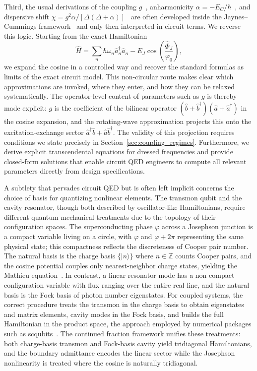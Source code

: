 \documentclass[reprint, floatfix, superscriptaddress, amsmath, amssymb, longbibliography]{revtex4-2}
\begin{document}
Third, the usual derivations of the coupling $g$~\cite{Blais2004}, anharmonicity $\alpha=-E_C/\hbar$~\cite{Koch2007}, and dispersive shift $\chi=g^2\alpha/[\Delta(\Delta+\alpha)]$~\cite{Koch2007, Boissonneault2009} are often developed inside the Jaynes--Cummings framework~\cite{JaynesCummings1963} and only then interpreted in circuit terms. We reverse this logic. Starting from the exact Hamiltonian
\begin{equation}
\hat{H}=\sum_n \hbar\omega_n \hat{a}_n^\dagger \hat{a}_n - E_J\cos\left(\frac{\hat{\Phi}_J}{\varphi_0}\right),
\end{equation}
we expand the cosine in a controlled way and recover the standard formulas as limits of the exact circuit model. This non-circular route makes clear which approximations are invoked, where they enter, and how they can be relaxed systematically. The operator-level content of parameters such as $g$ is thereby made explicit: $g$ is the coefficient of the bilinear operator $(\hat{b}+\hat{b}^\dagger)(\hat{a}+\hat{a}^\dagger)$ in the cosine expansion, and the rotating-wave approximation projects this onto the excitation-exchange sector $\hat{a}^\dagger\hat{b} + \hat{a}\hat{b}^\dagger$. The validity of this projection requires conditions we state precisely in Section~\ref{sec:coupling_regimes}. Furthermore, we derive explicit transcendental equations for dressed frequencies and provide closed-form solutions that enable circuit QED engineers to compute all relevant parameters directly from design specifications.

A subtlety that pervades circuit QED but is often left implicit concerns the choice of basis for quantizing nonlinear elements. The transmon qubit and the cavity resonator, though both described by oscillator-like Hamiltonians, require different quantum mechanical treatments due to the topology of their configuration spaces. The superconducting phase $\varphi$ across a Josephson junction is a compact variable living on a circle, with $\varphi$ and $\varphi + 2\pi$ representing the same physical state; this compactness reflects the discreteness of Cooper pair number. The natural basis is the charge basis $\{|n\rangle\}$ where $n \in \mathbb{Z}$ counts Cooper pairs, and the cosine potential couples only nearest-neighbor charge states, yielding the Mathieu equation~\cite{Koch2007}. In contrast, a linear resonator mode has a non-compact configuration variable with flux ranging over the entire real line, and the natural basis is the Fock basis of photon number eigenstates. For coupled systems, the correct procedure treats the transmon in the charge basis to obtain eigenstates and matrix elements, cavity modes in the Fock basis, and builds the full Hamiltonian in the product space, the approach employed by numerical packages such as scqubits~\cite{Groszkowski2021}. The continued fraction framework unifies these treatments: both charge-basis transmon and Fock-basis cavity yield tridiagonal Hamiltonians, and the boundary admittance encodes the linear sector while the Josephson nonlinearity is treated where the cosine is naturally tridiagonal.
\end{document}
